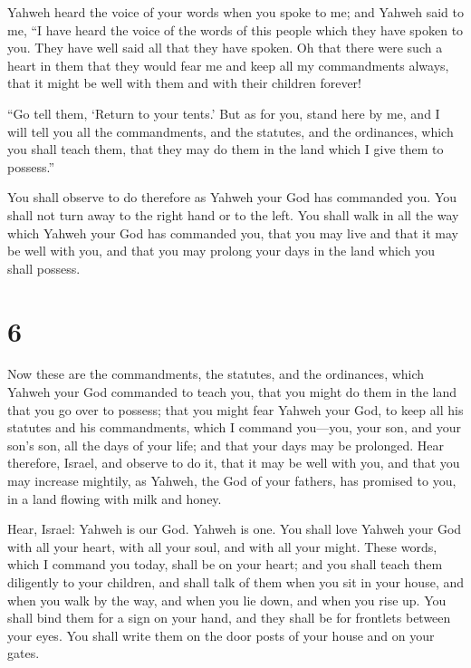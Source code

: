  Yahweh heard the voice of your words when you spoke to me;
and Yahweh said to me, ``I have heard the voice of the words of this
people which they have spoken to you. They have well said all that they
have spoken.  Oh that there were such a heart in them that
they would fear me and keep all my commandments always, that it might be
well with them and with their children forever!

 ``Go tell them, `Return to your tents.'  But
as for you, stand here by me, and I will tell you all the commandments,
and the statutes, and the ordinances, which you shall teach them, that
they may do them in the land which I give them to possess.''

 You shall observe to do therefore as Yahweh your God has
commanded you. You shall not turn away to the right hand or to the left.
 You shall walk in all the way which Yahweh your God has
commanded you, that you may live and that it may be well with you, and
that you may prolong your days in the land which you shall possess.

\hypertarget{section-5}{%
\section{6}\label{section-5}}

 Now these are the commandments, the statutes, and the
ordinances, which Yahweh your God commanded to teach you, that you might
do them in the land that you go over to possess;  that you
might fear Yahweh your God, to keep all his statutes and his
commandments, which I command you---you, your son, and your son's son,
all the days of your life; and that your days may be prolonged.
 Hear therefore, Israel, and observe to do it, that it may
be well with you, and that you may increase mightily, as Yahweh, the God
of your fathers, has promised to you, in a land flowing with milk and
honey.

 Hear, Israel: Yahweh is our God. Yahweh is one.
 You shall love Yahweh your God with all your heart, with
all your soul, and with all your might.  These words, which
I command you today, shall be on your heart;  and you shall
teach them diligently to your children, and shall talk of them when you
sit in your house, and when you walk by the way, and when you lie down,
and when you rise up.  You shall bind them for a sign on
your hand, and they shall be for frontlets between your eyes.
 You shall write them on the door posts of your house and on
your gates.

